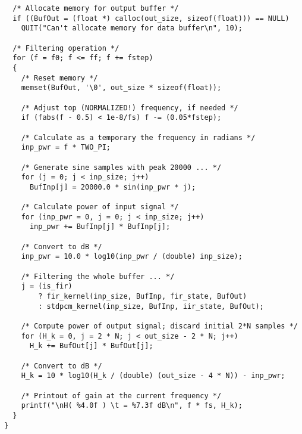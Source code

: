 {\begin{verbatim}
  /* Allocate memory for output buffer */
  if ((BufOut = (float *) calloc(out_size, sizeof(float))) == NULL)
    QUIT("Can't allocate memory for data buffer\n", 10);

  /* Filtering operation */
  for (f = f0; f <= ff; f += fstep)
  {
    /* Reset memory */
    memset(BufOut, '\0', out_size * sizeof(float));

    /* Adjust top (NORMALIZED!) frequency, if needed */
    if (fabs(f - 0.5) < 1e-8/fs) f -= (0.05*fstep);

    /* Calculate as a temporary the frequency in radians */
    inp_pwr = f * TWO_PI;

    /* Generate sine samples with peak 20000 ... */
    for (j = 0; j < inp_size; j++)
      BufInp[j] = 20000.0 * sin(inp_pwr * j);

    /* Calculate power of input signal */
    for (inp_pwr = 0, j = 0; j < inp_size; j++)
      inp_pwr += BufInp[j] * BufInp[j];

    /* Convert to dB */
    inp_pwr = 10.0 * log10(inp_pwr / (double) inp_size);

    /* Filtering the whole buffer ... */
    j = (is_fir)
        ? fir_kernel(inp_size, BufInp, fir_state, BufOut)
        : stdpcm_kernel(inp_size, BufInp, iir_state, BufOut);

    /* Compute power of output signal; discard initial 2*N samples */
    for (H_k = 0, j = 2 * N; j < out_size - 2 * N; j++)
      H_k += BufOut[j] * BufOut[j];

    /* Convert to dB */
    H_k = 10 * log10(H_k / (double) (out_size - 4 * N)) - inp_pwr;

    /* Printout of gain at the current frequency */
    printf("\nH( %4.0f ) \t = %7.3f dB\n", f * fs, H_k);
  }
}
\end{verbatim}
}
